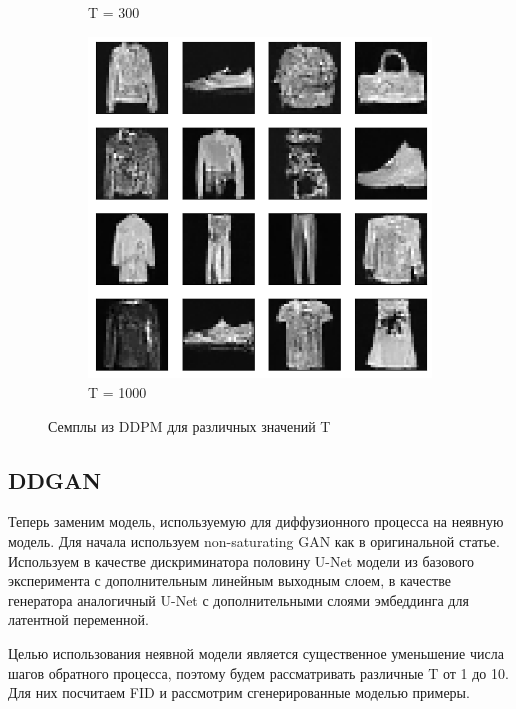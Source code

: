\documentclass{article}
\begin{document}
\begin{figure}[h!]
\begin{subfigure}[h]{0.3\linewidth}
		\caption{T = 300}
	\end{subfigure}
	\hfill
	\begin{subfigure}[h]{0.3\linewidth}
		\centering
		\includegraphics[scale=0.3]{../code/generated_DDPM_1000.png}
		\caption{T = 1000}
	\end{subfigure}
\caption{Семплы из DDPM для различных значений T}
\end{figure}

\subsection{DDGAN}
Теперь заменим модель, используемую для диффузионного процесса на неявную модель. Для начала используем non-saturating GAN \cite{https://doi.org/10.48550/arxiv.1406.2661} как в оригинальной статье. Используем в качестве дискриминатора половину U-Net модели из базового эксперимента с дополнительным линейным выходным слоем, в качестве генератора аналогичный U-Net с дополнительными слоями эмбеддинга для латентной переменной. 

Целью использования неявной модели является существенное уменьшение числа шагов обратного процесса, поэтому будем рассматривать различные T от 1 до 10. Для них посчитаем FID и рассмотрим сгенерированные моделью примеры.
\end{document}
